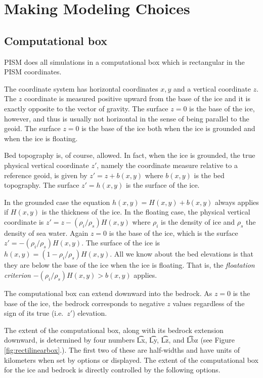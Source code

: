 
\section{Making Modeling Choices}
\label{sec:modeling-choices}

\subsection{Computational box} \label{subsect:coords}
\renewcommand{\optindexsection}{Computational box}

PISM does all simulations in a computational box which is rectangular in the PISM coordinates.

The coordinate system has horizontal coordinates $x,y$ and a vertical coordinate $z$.  The $z$ coordinate is measured positive upward from the base of the ice and it is exactly opposite to the vector of gravity.  The surface $z=0$ is the base of the ice, however, and thus is usually not horizontal in the sense of being parallel to the geoid.   The surface $z=0$ is the base of the ice both when the ice is grounded and when the ice is floating.

Bed topography is, of course, allowed.  In fact, when the ice is grounded, the true physical vertical coordinate $z'$, namely the coordinate measure relative to a reference geoid, is given by $z'=z+b(x,y)$ where $b(x,y)$ is the bed topography.  The surface $z'=h(x,y)$ is the surface of the ice.

In the grounded case the equation $h(x,y)=H(x,y)+b(x,y)$ always applies if $H(x,y)$ is the thickness of the ice.  In the floating case, the physical vertical coordinate is $z'=z-(\rho_i/\rho_s) H(x,y)$ where $\rho_i$ is the density of ice and $\rho_s$ the density of sea water.  Again $z=0$ is the base of the ice, which is the surface $z' = -(\rho_i/\rho_s) H(x,y)$.  The surface of the ice is $h(x,y) = (1-\rho_i/\rho_s) H(x,y)$.  All we know about the bed elevations is that they are below the base of the ice when the ice is floating.  That is, the \emph{floatation criterion} $-(\rho_i/\rho_s) H(x,y) > b(x,y)$ applies.

The computational box can extend downward into the bedrock.  As $z=0$ is the base of the ice, the bedrock corresponds to negative $z$ values regardless of the sign of its true (i.e.~$z'$) elevation.

The extent of the computational box, along with its bedrock extension downward, is determined by four numbers \t{Lx}, \t{Ly}, \t{Lz}, and \t{Lbz} (see Figure \ref{fig:rectilinearbox}.).  The first two of these are half-widths and have units of kilometers when set by options or displayed.  The extent of the computational box for the ice and bedrock is directly controlled by the following options. 

